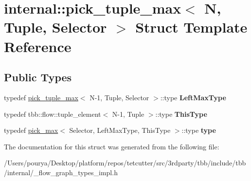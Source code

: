 \hypertarget{structinternal_1_1pick__tuple__max}{}\section{internal\+:\+:pick\+\_\+tuple\+\_\+max$<$ N, Tuple, Selector $>$ Struct Template Reference}
\label{structinternal_1_1pick__tuple__max}
\subsection*{Public Types}
\begin{DoxyCompactItemize}
\item 
\hypertarget{structinternal_1_1pick__tuple__max_a331ccf1d6b21aae7cbd46b1220343daf}{}typedef \hyperlink{structinternal_1_1pick__tuple__max}{pick\+\_\+tuple\+\_\+max}$<$ N-\/1, Tuple, Selector $>$\+::type {\bfseries Left\+Max\+Type}\label{structinternal_1_1pick__tuple__max_a331ccf1d6b21aae7cbd46b1220343daf}

\item 
\hypertarget{structinternal_1_1pick__tuple__max_ab6ec38e774cc73017bf43be37c0c3f7a}{}typedef tbb\+::flow\+::tuple\+\_\+element$<$ N-\/1, Tuple $>$\+::type {\bfseries This\+Type}\label{structinternal_1_1pick__tuple__max_ab6ec38e774cc73017bf43be37c0c3f7a}

\item 
\hypertarget{structinternal_1_1pick__tuple__max_ad4c227f18add5443d1c17651ee4aad01}{}typedef \hyperlink{structinternal_1_1pick__max}{pick\+\_\+max}$<$ Selector, Left\+Max\+Type, This\+Type $>$\+::type {\bfseries type}\label{structinternal_1_1pick__tuple__max_ad4c227f18add5443d1c17651ee4aad01}

\end{DoxyCompactItemize}


The documentation for this struct was generated from the following file\+:\begin{DoxyCompactItemize}
\item 
/\+Users/pourya/\+Desktop/platform/repos/tetcutter/src/3rdparty/tbb/include/tbb/internal/\+\_\+flow\+\_\+graph\+\_\+types\+\_\+impl.\+h\end{DoxyCompactItemize}
